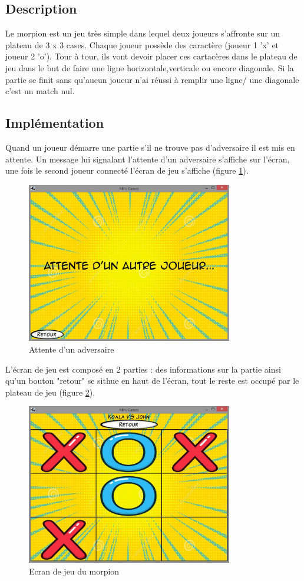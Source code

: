 \documentclass{report}
\begin{document}
\subsection{Description}
Le morpion est un jeu très simple dans lequel deux joueurs s'affronte sur un plateau de 3 x 3 cases. Chaque joueur possède des caractère (joueur 1 'x' et joueur 2 'o').
Tour à tour, ils vont devoir placer ces cartacères dans le plateau de jeu dans le but de faire une ligne horizontale,verticale ou encore diagonale.
Si la partie se finit sans qu'aucun joueur n'ai réussi à remplir une ligne/ une diagonale c'est un match nul.
\subsection{Implémentation}

Quand un joueur démarre une partie s'il ne trouve pas d'adversaire il est mis en attente. Un message lui signalant l'attente d'un
adversaire s'affiche sur l'écran, une fois le second joueur connecté l'écran de jeu s'affiche (figure \ref{attente_adversaire}).

\begin{figure}[H]
	\centering\includegraphics[width=9cm]{morpionwaiting}
	\caption{Attente d'un adversaire}
  \label{attente_adversaire}
\end{figure}

L'écran de jeu est composé en 2 parties : des informations sur la partie ainsi qu'un bouton "retour" se sithue en haut
de l'écran, tout le reste est occupé par le plateau de jeu (figure \ref{morpion_en_jeu}).

\begin{figure}[H]
	\centering\includegraphics[width=9cm]{morpioningame}
	\caption{Ecran de jeu du morpion}
  \label{morpion_en_jeu}
\end{figure}
\end{document}
